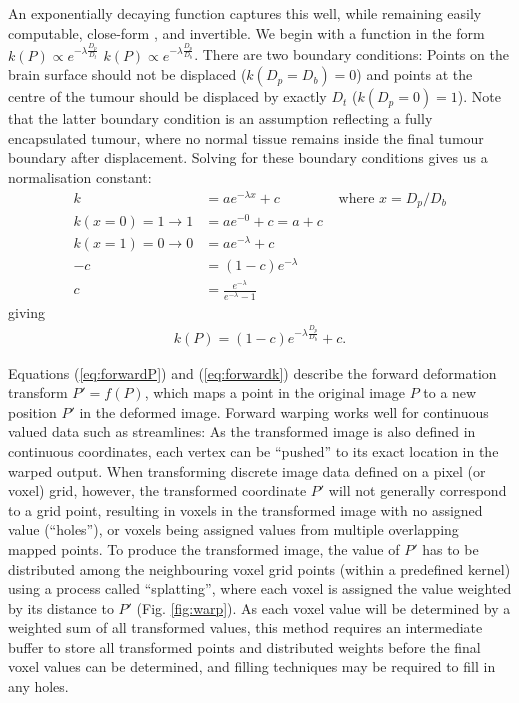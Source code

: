 \documentclass[12pt,phd,a4paper,twoside]{ucl_thesis}
\providecommand{\DIFaddtex}[1]{{\protect\color{blue} \sf #1}} %
\providecommand{\DIFdeltex}[1]{{\protect\color{red} \scriptsize #1}} %
\providecommand{\DIFaddbegin}{} %
\providecommand{\DIFaddend}{} %
\providecommand{\DIFdelbegin}{} %
\providecommand{\DIFdelend}{} %
\providecommand{\DIFadd}[1]{\texorpdfstring{\DIFaddtex{#1}}{#1}} %
\providecommand{\DIFdel}[1]{\texorpdfstring{\DIFdeltex{#1}}{}} %
\newcommand{\DIFscaledelfig}{0.5}
\newlength{\DIFdelgraphicswidth} %
\newlength{\DIFdelgraphicsheight} %
\newcommand{\DIFaddincludegraphics}[2][]{{\color{blue}\fbox{\DIFOincludegraphics[#1]{#2}}}} %
\newcommand{\DIFdelincludegraphics}[2][]{%
\sbox{\DIFdelgraphicsbox}{\DIFOincludegraphics[#1]{#2}}%
\settoboxwidth{\DIFdelgraphicswidth}{\DIFdelgraphicsbox} %
\settoboxtotalheight{\DIFdelgraphicsheight}{\DIFdelgraphicsbox} %
\scalebox{\DIFscaledelfig}{%
\parbox[b]{\DIFdelgraphicswidth}{\usebox{\DIFdelgraphicsbox}\\[-\baselineskip] \rule{\DIFdelgraphicswidth}{0em}}\llap{\resizebox{\DIFdelgraphicswidth}{\DIFdelgraphicsheight}{%
\setlength{\unitlength}{\DIFdelgraphicswidth}%
\begin{picture}(1,1)%
\thicklines\linethickness{2pt} %
{\color[rgb]{1,0,0}\put(0,0){\framebox(1,1){}}}%
{\color[rgb]{1,0,0}\put(0,0){\line( 1,1){1}}}%
{\color[rgb]{1,0,0}\put(0,1){\line(1,-1){1}}}%
\end{picture}%
}\hspace*{3pt}}} %
} %
\DeclareRobustCommand{\DIFaddbegin}{\DIFOaddbegin \let\includegraphics\DIFaddincludegraphics} %
\DeclareRobustCommand{\DIFaddend}{\DIFOaddend \let\includegraphics\DIFOincludegraphics} %
\DeclareRobustCommand{\DIFdelbegin}{\DIFOdelbegin \let\includegraphics\DIFdelincludegraphics} %
\DeclareRobustCommand{\DIFdelend}{\DIFOaddend \let\includegraphics\DIFOincludegraphics} %
\begin{document}
An exponentially decaying function captures this well, while remaining easily computable, close-form\DIFaddbegin \DIFadd{, }\DIFaddend and invertible.
We begin with a function in the form \DIFdelbegin \DIFdel{$k(P) \propto e^{-\lambda \frac{D_p}{D_t}}$}\DIFdelend \DIFaddbegin \DIFadd{$k(P) \propto e^{-\lambda \frac{D_p}{D_b}}$}\DIFaddend .
There are two boundary conditions:
Points on the brain surface should not be displaced ($k(D_p = D_b) = 0$) and points at the centre of the tumour should be displaced by exactly $D_t$ ($k(D_p = 0) = 1$).
Note that the latter boundary condition is an assumption reflecting a fully encapsulated tumour, where no normal tissue remains inside the final tumour boundary after displacement.
Solving for these boundary conditions gives us a normalisation constant:
\begin{align}
  k &= a e^{-\lambda x} + c &\text{ where } x = D_p / D_b \nonumber \\
  k(x=0)=1 \longrightarrow 1 &= a e^{-0} + c = a + c \nonumber \\
  k(x=1)=0 \longrightarrow 0 &= a e^{-\lambda} + c \nonumber \\
  -c &= (1-c) e^{-\lambda} \nonumber \\
  c &= \frac{e^{-\lambda}}{e^{-\lambda} - 1} \label{eq:c}
\end{align}
giving
\begin{align}\label{eq:forwardk}
  k(P) = (1-c)e^{-\lambda \frac{D_p}{D_b}} +c.
\end{align}

Equations (\ref{eq:forwardP}) and (\ref{eq:forwardk}) describe the forward deformation transform $P'=f(P)$, which maps a point in the original image $P$ to a new position $P'$ in the deformed image.
Forward warping works well for continuous valued data such as streamlines:
As the transformed image is also defined in continuous coordinates, each vertex can be ``pushed'' to its exact location in the warped output.
When transforming discrete image data defined on a pixel (or voxel) grid, however, the transformed coordinate $P'$ will not generally correspond to a grid point, resulting in voxels in the transformed image with no assigned value (``holes''), or voxels being assigned values from multiple overlapping mapped points.
To produce the transformed image, the value of $P'$ has to be distributed among the neighbouring voxel grid points (within a predefined kernel) using a process called ``splatting''\autocite{Niklaus2020}, where each voxel is assigned the value weighted by its distance to $P'$ (Fig. \ref{fig:warp}).
As each voxel value will be determined by a weighted sum of all transformed values, this method requires an intermediate buffer to store all transformed points and distributed weights before the final voxel values can be determined, and filling techniques may be required to fill in any holes.
\end{document}
